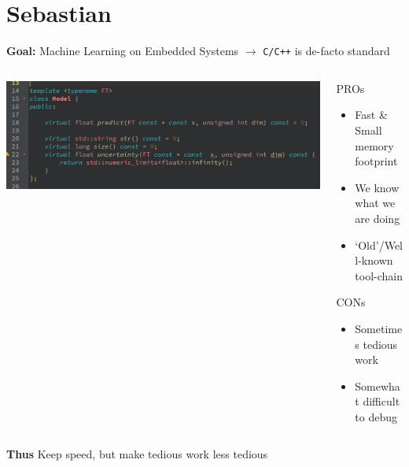 \documentclass[aspectratio=169,10pt]{beamer}
\begin{document}
\section{Sebastian}
\begin{frame}[fragile]{\textbf{Goal:} Machine Learning on Embedded Systems $\to$ \texttt{C/C++} is de-facto standard}
    \pause
    \begin{columns}
        \begin{column}{0.6\textwidth}
            \includegraphics[width=\textwidth]{img/sebastian-cpp.png}
        \end{column}
        
        \begin{column}{0.4\textwidth}
            \vspace{0.2cm}

            PROs
            \begin{itemize}
                \item Fast \& Small memory footprint
                \item We know what we are doing
                \item `Old'/Well-known tool-chain
            \end{itemize}
            CONs
            \begin{itemize}
                \item Sometimes tedious work
                \item Somewhat difficult to debug
            \end{itemize}
        \end{column}
    \end{columns}

    \pause
    \vspace{-0.2cm}
    \textbf{Thus} Keep speed, but make tedious work less tedious
    \pause 


\end{frame}
\end{document}
